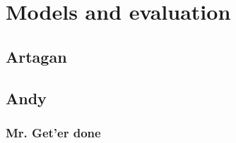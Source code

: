 \documentclass{llncs}
\begin{document}
\section{Models and evaluation}

\subsection*{Artagan}

\subsection*{Andy}



\subsubsection*{Mr. Get'er done}


          


\end{document}
